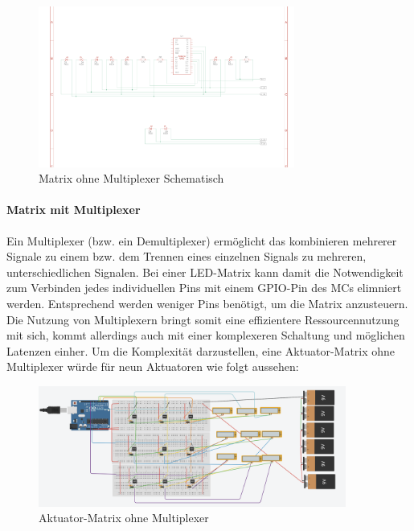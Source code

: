 \begin{figure}[htbp]
	\centering
	\includegraphics[width=0.75\textwidth]{img/LEDMatrixSchaltung}
	\caption{Matrix ohne Multiplexer Schematisch}
	\label{fig:Matrix}
\end{figure}
\newpage
\paragraph{Matrix mit Multiplexer}

Ein Multiplexer (bzw. ein Demultiplexer) ermöglicht das kombinieren mehrerer Signale zu einem bzw. dem Trennen eines einzelnen Signals zu mehreren, unterschiedlichen Signalen.
Bei einer LED-Matrix kann damit die Notwendigkeit zum Verbinden jedes individuellen Pins mit einem GPIO-Pin des \ac{MC}s elimniert werden.
Entsprechend werden weniger Pins benötigt, um die Matrix anzusteuern.
Die Nutzung von Multiplexern bringt somit eine effizientere Ressourcennutzung mit sich, kommt allerdings auch mit einer komplexeren Schaltung und möglichen Latenzen einher. %
\newline
Um die Komplexität darzustellen, eine Aktuator-Matrix ohne Multiplexer würde für neun Aktuatoren wie folgt aussehen:
\begin{figure}[htbp]
	\centering
	\includegraphics[width=0.9\textwidth]{img/AktMatrix}
	\caption{Aktuator-Matrix ohne Multiplexer}
	\label{fig:AktMatrix}
\end{figure}

